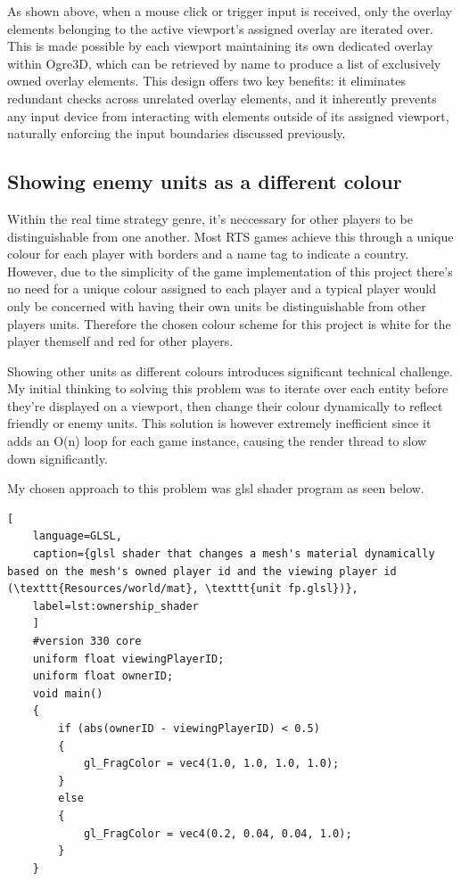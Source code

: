 \documentclass[]{final_report}
\begin{document}
As shown above, when a mouse click or trigger input is received, only the overlay elements belonging to the active viewport's assigned overlay are iterated over. This is made possible by each viewport maintaining its own dedicated overlay within Ogre3D, which can be retrieved by name to produce a list of exclusively owned overlay elements. This design offers two key benefits: it eliminates redundant checks across unrelated overlay elements, and it inherently prevents any input device from interacting with elements outside of its assigned viewport, naturally enforcing the input boundaries discussed previously. \newline

\subsection{Showing enemy units as a different colour}
Within the real time strategy genre, it's neccessary for other players to be distinguishable from one another. Most RTS games achieve this through a unique colour for each player with borders and a name tag to indicate a country.
However, due to the simplicity of the game implementation of this project there's no need for a unique colour assigned to each player and a typical player would only be concerned with having their own units be distinguishable from other players units. Therefore the chosen colour scheme for this project is white for the player themself and red for other players.

Showing other units as different colours introduces significant technical challenge. My initial thinking to solving this problem was to iterate over each entity before they're displayed on a viewport, then change their colour dynamically to reflect friendly or enemy units. This solution is however extremely inefficient since it adds an O(n) loop for each game instance, causing the render thread to slow down significantly.

My chosen approach to this problem was glsl shader program as seen below.


\begin{lstlisting}[
	language=GLSL,
	caption={glsl shader that changes a mesh's material dynamically based on the mesh's owned player id and the viewing player id (\texttt{Resources/world/mat}, \texttt{unit fp.glsl})},
	label=lst:ownership_shader
	]
	#version 330 core
	uniform float viewingPlayerID;
	uniform float ownerID;
	void main()
	{
		if (abs(ownerID - viewingPlayerID) < 0.5)
		{
			gl_FragColor = vec4(1.0, 1.0, 1.0, 1.0);
		}
		else
		{
			gl_FragColor = vec4(0.2, 0.04, 0.04, 1.0);
		}
	}
\end{lstlisting}
\end{document}
